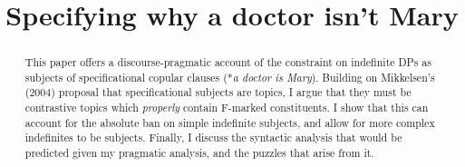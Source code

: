 \documentclass[
	letterpaper,
]{article}
\title{Specifying why a doctor isn't Mary}
\date{}
\begin{document}
\maketitle
\begin{abstract}
  This paper offers a discourse-pragmatic account of the constraint on indefinite DPs as subjects of specificational copular clauses (*\textit{a doctor is Mary}).
  Building on Mikkelsen's (2004) proposal that specificational subjects are topics, I argue that they must be contrastive topics which \textit{properly} contain F-marked constituents.
  I show that this can account for the absolute ban on simple indefinite subjects, and allow for more complex indefinites to be subjects.
  Finally, I discuss the syntactic analysis that would be predicted given my pragmatic analysis, and the puzzles that arise from it.
\end{abstract}
\doublespacing
\end{document}
